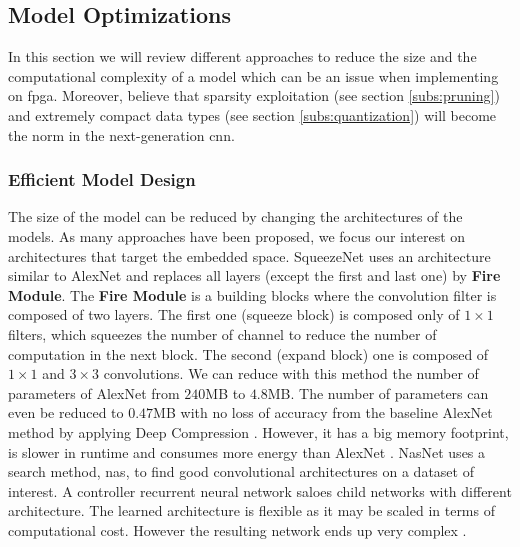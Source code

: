 \subsection{Model Optimizations} \label{subsec:mdopti}
 In this section we will review different approaches to reduce the size and the computational complexity of a model which can be an issue when implementing on \acrshort{fpga}. Moreover, \textcite{nurvitadhi_can_2017} believe that sparsity exploitation (see section \ref{subs:pruning}) and extremely compact data types (see section \ref{subs:quantization}) will become the norm in the next-generation \acrshort{cnn}.
\subsubsection{Efficient Model Design}
The size of the model can be reduced by changing the architectures of the models. As many approaches have been proposed, we focus our interest on architectures that target the embedded space. \newline \newline
%
SqueezeNet \cite{iandola_squeezenet_2016} uses an architecture similar to AlexNet and replaces all layers (except the first and last one) by \textbf{Fire Module}. The \textbf{Fire Module} is a building blocks where the convolution filter is composed of two layers. The first one (squeeze block) is composed only of $1 \times 1$ filters, which squeezes the number of channel to reduce the number of computation in the next block. The second (expand block) one is composed of $1 \times 1$ and $3 \times 3$ convolutions. We can reduce with this method the number of parameters of AlexNet from $240$MB to $4.8$MB. The number of parameters can even be reduced to $0.47$MB with no loss of accuracy from the baseline AlexNet method by applying Deep Compression \cite{han_deep_2016}. However, it has a big memory footprint, is slower in runtime and consumes more energy than AlexNet \cite{sze_efficient_2017}.\newline \newline
%
NasNet \cite{zoph_learning_2018} uses a search method, \acrfull{nas}, to find good convolutional architectures on a dataset of interest. A controller recurrent neural network saloes child networks with different architecture. The learned architecture is flexible as it may be scaled in terms of computational cost. However the resulting network ends up very complex \cite{sandler_mobilenetv2_2019}.\newline \newline
